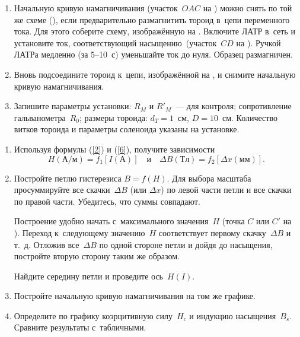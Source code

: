 \begin{lab:task}
\begin{enumerate}
	\item Начальную кривую намагничивания (участок~$OAC$ на ) можно снять по той же схеме (), если предварительно
	размагнитить тороид в~цепи переменного тока. Для этого соберите схему, изображённую на . Включите ЛАТР в~сеть и
	установите ток, соответствующий насыщению~(участок~$CD$ на ). Ручкой ЛАТРа медленно (за 5--10~с) уменьшайте ток до
	нуля. Образец размагничен.
	
	\item Вновь подсоедините тороид к~цепи, изображённой на , и снимите начальную кривую намагничивания.
	
	\item Запишите параметры установки: $R_M$ и $R'_M$~--- для контроля; сопротивление гальванометра~$R_0$; размеры тороида:
	$d_T=1$~см, $D=10$~см. Количество витков тороида и параметры соленоида указаны на установке.
	
	\end{enumerate}	
	
	
	\begin{enumerate}
	
		\item Используя формулы (\eqref{2}) и (\eqref{6}), получите зависимости
		\begin{equation*}
			H(А/м)=f_1[I(А)]\quad и\quad \Delta B(Тл)=f_2[\Delta x(мм)].
		\end{equation*}
		
		\item Постройте петлю гистерезиса $B=f(H)$. Для выбора масштаба просуммируйте все скачки~$\Delta B$ (или $\Delta x$) по левой части
		петли и все скачки по правой части. Убедитесь, что суммы совпадают.
		
		Построение удобно начать с~максимального значения~$H$ (точка $C$ или $C'$ на ). Переход к~следующему значению~$H$
		соответствует первому скачку~$\Delta B$ и т.~д. Отложив все~$\Delta B$ по одной стороне петли и дойдя до насыщения, постройте
		вторую сторону таким же образом.
		
		Найдите середину петли и проведите ось~$H(I)$.
		
		\item Постройте начальную кривую намагничивания на том же графике.
		
		\item Определите по графику коэрцитивную силу~$H_c$ и индукцию насыщения~$B_s$. Сравните результаты с~табличными.
		

\end{enumerate}
\end{lab:task}
